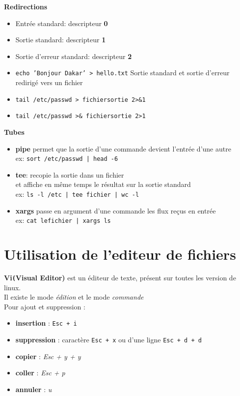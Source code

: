 \documentclass[french]{beamer}
\begin{document}
\begin{frame}
\textbf{Redirections} \\
    \begin{itemize}
    \item Entrée standard: descripteur \textbf{0}
    \item Sortie standard: descripteur \textbf{1}
    \item Sortie d'erreur standard: descripteur \textbf{2}
    \item \texttt{echo 'Bonjour Dakar' > hello.txt}
    Sortie standard et sortie d'erreur redirigé vers un fichier
    \item \texttt{tail /etc/passwd > fichiersortie 2>\&1 }
    \item \texttt{tail /etc/passwd >\& fichiersortie 2>1 }
    \end{itemize}
\end{frame}


\begin{frame}
\textbf{Tubes}
    \begin{itemize}
    \item \textbf{pipe} permet que la sortie d'une commande devient l'entrée
    d'une autre \\
    ex: \texttt{sort /etc/passwd | head -6}
    \item \textbf{tee}: recopie la sortie dans un fichier \\et affiche en même
    temps le résultat sur la sortie standard \\
    ex: \texttt{ls -l /etc | tee fichier | wc  -l}
    \item \textbf{xargs} passe en argument d'une commande les flux reçus en
    entrée\\
    ex: \texttt{cat lefichier | xargs ls}

    \end{itemize}
\end{frame}


\section{Utilisation de l'editeur de fichiers}
\frame{\tableofcontents[current]}


\begin{frame}
\textbf{Vi\texttt(Visual Editor)} 
est un éditeur de texte, présent sur toutes les version de linux. \\
Il existe le mode \textit{édition} et le mode \textit{commande} \\
Pour ajout et suppression :
\begin{itemize}
    \item \textbf{insertion} : \texttt{Esc + i} 
    \item \textbf{suppression} : caractère \texttt{Esc + x} ou d'une ligne \texttt{Esc + d + d}
    \item \textbf{copier} : \textit{Esc + y + y} 
    \item \textbf{coller} : \textit{Esc + p} 
    \item \textbf{annuler} : \textit{u} 
    \end{itemize}
\end{frame}
\end{document}
